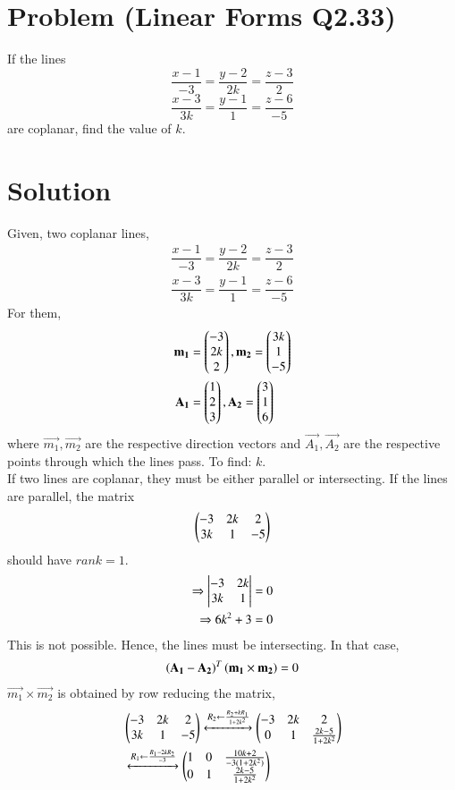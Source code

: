 \documentclass[journal,12pt,twocolumn]{IEEEtran}
\begin{document}
\section{Problem (Linear Forms Q2.33)}
If the lines
$$\dfrac{x-1}{-3}=\dfrac{y-2}{2k}=\dfrac{z-3}{2}$$
$$\dfrac{x-3}{3k}=\dfrac{y-1}{1}=\dfrac{z-6}{-5}$$
are coplanar, find the value of $k$.
\section{Solution}
Given, two coplanar lines,
\begin{align}
\dfrac{x-1}{-3}=\dfrac{y-2}{2k}=\dfrac{z-3}{2}\\
\dfrac{x-3}{3k}=\dfrac{y-1}{1}=\dfrac{z-6}{-5}
\end{align}
For them,
\begin{align}
    \mathbf{m_{1}}&=\begin{pmatrix}-3\\
    2k\\
    2\end{pmatrix}, \mathbf{m_{2}}=\begin{pmatrix}3k\\
    1\\
    -5\end{pmatrix}\\
    \mathbf{A_{1}}&=\begin{pmatrix}1\\
    2\\
    3\end{pmatrix}, \mathbf{A_{2}}=\begin{pmatrix}3\\
    1\\
    6\end{pmatrix}
\end{align}
where $\vec{m_{1}},\vec{m_{2}}$ are the respective direction vectors and $\vec{A_{1}},\vec{A_{2}}$ are the respective points through which the lines pass. To find: $k$.\\
If two lines are coplanar, they must be either parallel or intersecting. If the lines are parallel, the matrix
\begin{align}
    \begin{pmatrix}-3 & 2k & 2 \\
    3k & 1 & -5\end{pmatrix}
\end{align}
should have $rank=1$.
\begin{align}
    \Rightarrow \begin{vmatrix}-3 & 2k \\
    3k & 1\end{vmatrix} &=0\\
    \Rightarrow 6k^{2}+3&=0
\end{align}
This is not possible. Hence, the lines must be intersecting. In that case,
\begin{align}
    \left(\mathbf{A_{1}}-\mathbf{A_{2}}\right)^{T}\left(\mathbf{m_{1}}\times\mathbf{m_{2}}\right)=0\label{eq:a}
\end{align}
$\vec{m_{1}}\times\vec{m_{2}}$ is obtained by row reducing the matrix,
\begin{align}
    &\begin{pmatrix}-3 & 2k & 2 \\
    3k & 1 & -5\end{pmatrix}\xleftrightarrow {R_2\leftarrow\frac{R_2+kR_1}{1+2k^2}}\begin{pmatrix}-3 & 2k & 2 \\
    0 & 1 & \frac{2k-5}{1+2k^{2}}\end{pmatrix}\\
    &\xleftrightarrow {R_1\leftarrow \frac{R_1-2kR_2}{-3}}\begin{pmatrix}1 & 0 & \frac{10k+2}{-3(1+2k^{2})} \\
    0 & 1 & \frac{2k-5}{1+2k^{2}}\end{pmatrix}
\end{align}
\end{document}

